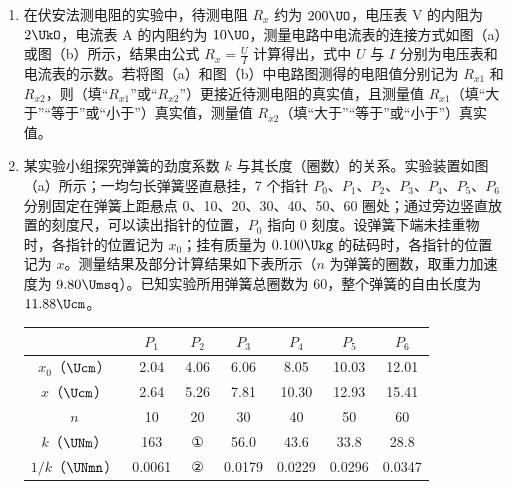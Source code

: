 \documentclass[\gkver]{gaokaozhenti}
\newcommand{\ccnum}[1]{{\fontspec{Noto Sans CJK JP}#1}}
\begin{document}
\begin{enumerate}
\item
在伏安法测电阻的实验中，待测电阻 $R_{x}$ 约为 $200\UO$，电压表 V 的内阻为 $2\UkO$，电流表 A 的内阻约为 $10\UO$，测量电路中电流表的连接方式如图（a）或图（b）所示，结果由公式 $R_{x}=\frac{U}{I}$ 计算得出，式中 $U$ 与 $I$ 分别为电压表和电流表的示数。若将图（a）和图（b）中电路图测得的电阻值分别记为 $R_{x1}$ 和 $R_{x2}$，则（填“$R_{x1}$”或“$R_{x2}$”）更接近待测电阻的真实值，且测量值 $R_{x1}$（填“大于”“等于”或“小于”）真实值，测量值 $R_{x2}$（填“大于”“等于”或“小于”）真实值。

\item
某实验小组探究弹簧的劲度系数 $k$ 与其长度（圈数）的关系。实验装置如图（a）所示；一均匀长弹簧竖直悬挂，7 个指针 $P_{0}$、$P_{1}$、$P_{2}$、$P_{3}$、$P_{4}$、$P_{5}$、$P_{6}$ 分别固定在弹簧上距悬点 0、10、20、30、40、50、60 圈处；通过旁边竖直放置的刻度尺，可以读出指针的位置，$P_{0}$ 指向 0 刻度。设弹簧下端未挂重物时，各指针的位置记为 $x_{0}$；挂有质量为 $0.100\Ukg$ 的砝码时，各指针的位置记为 $x$。测量结果及部分计算结果如下表所示（$n$ 为弹簧的圈数，取重力加速度为 $9.80\Umsq$）。已知实验所用弹簧总圈数为 60，整个弹簧的自由长度为 $11.88\Ucm$。

\begin{center}
\begin{tabular}{|c|c|c|c|c|c|c|}
\hline
	 & $P_{1}$ & $P_{2}$ & $P_{3}$ & $P_{4}$ & $P_{5}$ & $P_{6}$ \\ \hline
	$x_{0}$（$\Ucm$） & 2.04 & 4.06 & 6.06 & 8.05 & 10.03 & 12.01 \\ \hline
	$x$（$\Ucm$） & 2.64 & 5.26 & 7.81 & 10.30 & 12.93 & 15.41 \\ \hline
	$n$ & 10 & 20 & 30 & 40 & 50 & 60 \\ \hline
	$k$（$\UNm$） & 163 & \ccnum{①} & 56.0 & 43.6 & 33.8 & 28.8 \\ \hline
	$1/k$（$\UNmn$） & 0.0061 & \ccnum{②} & 0.0179 & 0.0229 & 0.0296 & 0.0347 \\ \hline
\end{tabular}
\end{center}


\end{enumerate}
\end{document}
